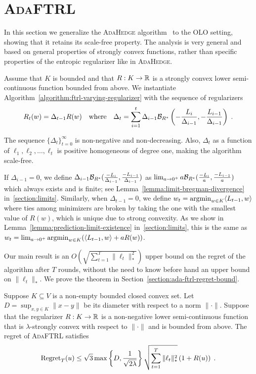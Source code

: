 \section{\textsc{AdaFTRL}}
\label{section:ada-ftrl}

In this section we generalize the \textsc{AdaHedge}
algorithm~\cite{de-Rooij-van-Erven-Grunwald-Koolen-2014} to the OLO setting,
showing that it retains its scale-free property. The analysis is very general
and based on general properties of strongly convex functions, rather than
specific properties of the entropic regularizer like in \textsc{AdaHedge}.

Assume that $K$ is bounded and that $R:K \to \mathbb{R}$ is a strongly convex lower
semi-continuous function bounded from above.  We instantiate
Algorithm~\ref{algorithm:ftrl-varying-regularizer} with the sequence of
regularizers
\begin{equation}
\label{equation:ada-ftrl}
R_t(w) = \Delta_{t-1} R(w)
\quad \text{where}
\quad \Delta_{t}=\sum_{i=1}^{t} \Delta_{i-1} \mathcal{B}_{R^*}\left(- \frac{L_i}{\Delta_{i-1}}, -\frac{L_{i-1}}{\Delta_{i-1}}\right) \; .
\end{equation}

The sequence $\{\Delta_t\}_{t=0}^\infty$ is non-negative and non-decreasing.
Also, $\Delta_t$ as a function of $\ell_1, \ell_2, \dots, \ell_t$ is positive
homogeneous of degree one, making the algorithm scale-free.

If $\Delta_{i-1} = 0$, we define $\Delta_{i-1}
\mathcal{B}_{R^*}(\frac{-L_i}{\Delta_{i-1}}, \frac{-L_{i-1}}{\Delta_{i-1}})$ as
$\lim_{a \to 0^+} a \mathcal{B}_{R^*}(\frac{-L_i}{a}, \frac{-L_{i-1}}{a})$ which
always exists and is finite; see Lemma~\ref{lemma:limit-bregman-divergence}
in~\ref{section:limits}.  Similarly, when $\Delta_{t-1} = 0$, we define $w_t =
\operatorname*{argmin}_{w \in K} \langle L_{t-1}, w \rangle$ where ties among minimizers are
broken by taking the one with the smallest value of $R(w)$, which is unique due
to strong convexity. As we show in Lemma~\ref{lemma:prediction-limit-existence}
in~\ref{section:limits}, this is the same as $w_t = \lim_{a \to 0^+} \operatorname*{argmin}_{w
\in K} (\langle L_{t-1}, w \rangle + aR(w))$.

Our main result is an $O(\sqrt{\sum_{t=1}^T \|\ell_t\|_*^2})$ upper bound on
the regret of the algorithm after $T$ rounds, without the need to know before
hand an upper bound on $\|\ell_t\|_*$.  We prove the theorem in
Section~\ref{section:ada-ftrl-regret-bound}.

\begin{theorem}
\label{theorem:ada-ftrl-regret-bound}
Suppose $K \subseteq V$ is a non-empty bounded closed convex set. Let $D =
\sup_{x,y \in K} \|x - y\|$ be its diameter with respect to a norm $\|\cdot\|$.
Suppose that the regularizer $R:K \to \mathbb{R}$ is a non-negative lower
semi-continuous function that is $\lambda$-strongly convex with respect to
$\|\cdot\|$ and is bounded from above.  The regret of \textsc{AdaFTRL}
satisfies
$$
\operatorname{Regret}_T(u)
\le \sqrt{3} \max\left\{D, \frac{1}{\sqrt{2\lambda}} \right\}
    \sqrt{\sum_{t=1}^T \|\ell_t\|_*^2} \left(1 + R(u) \right) \; .
$$
\end{theorem}

